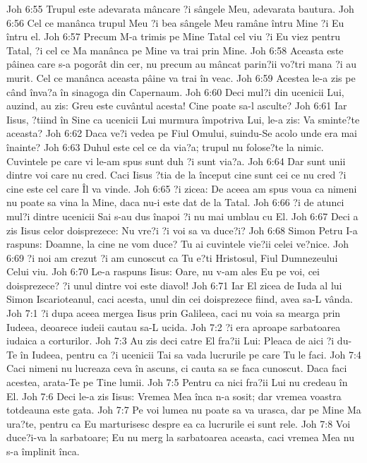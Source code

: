 Joh 6:55  Trupul este adevarata mâncare ?i sângele Meu, adevarata bautura.
Joh 6:56  Cel ce manânca trupul Meu ?i bea sângele Meu ramâne întru Mine ?i Eu întru el.
Joh 6:57  Precum M-a trimis pe Mine Tatal cel viu ?i Eu viez pentru Tatal, ?i cel ce Ma manânca pe Mine va trai prin Mine.
Joh 6:58  Aceasta este pâinea care s-a pogorât din cer, nu precum au mâncat parin?ii vo?tri mana ?i au murit. Cel ce manânca aceasta pâine va trai în veac.
Joh 6:59  Acestea le-a zis pe când înva?a în sinagoga din Capernaum.
Joh 6:60  Deci mul?i din ucenicii Lui, auzind, au zis: Greu este cuvântul acesta! Cine poate sa-l asculte?
Joh 6:61  Iar Iisus, ?tiind în Sine ca ucenicii Lui murmura împotriva Lui, le-a zis: Va sminte?te aceasta?
Joh 6:62  Daca ve?i vedea pe Fiul Omului, suindu-Se acolo unde era mai înainte?
Joh 6:63  Duhul este cel ce da via?a; trupul nu folose?te la nimic. Cuvintele pe care vi le-am spus sunt duh ?i sunt via?a.
Joh 6:64  Dar sunt unii dintre voi care nu cred. Caci Iisus ?tia de la început cine sunt cei ce nu cred ?i cine este cel care Îl va vinde.
Joh 6:65  ?i zicea: De aceea am spus voua ca nimeni nu poate sa vina la Mine, daca nu-i este dat de la Tatal.
Joh 6:66  ?i de atunci mul?i dintre ucenicii Sai s-au dus înapoi ?i nu mai umblau cu El.
Joh 6:67  Deci a zis Iisus celor doisprezece: Nu vre?i ?i voi sa va duce?i?
Joh 6:68  Simon Petru I-a raspuns: Doamne, la cine ne vom duce? Tu ai cuvintele vie?ii celei ve?nice.
Joh 6:69  ?i noi am crezut ?i am cunoscut ca Tu e?ti Hristosul, Fiul Dumnezeului Celui viu.
Joh 6:70  Le-a raspuns Iisus: Oare, nu v-am ales Eu pe voi, cei doisprezece? ?i unul dintre voi este diavol!
Joh 6:71  Iar El zicea de Iuda al lui Simon Iscarioteanul, caci acesta, unul din cei doisprezece fiind, avea sa-L vânda.
Joh 7:1  ?i dupa aceea mergea Iisus prin Galileea, caci nu voia sa mearga prin Iudeea, deoarece iudeii cautau sa-L ucida.
Joh 7:2  ?i era aproape sarbatoarea iudaica a corturilor.
Joh 7:3  Au zis deci catre El fra?ii Lui: Pleaca de aici ?i du-Te în Iudeea, pentru ca ?i ucenicii Tai sa vada lucrurile pe care Tu le faci.
Joh 7:4  Caci nimeni nu lucreaza ceva în ascuns, ci cauta sa se faca cunoscut. Daca faci acestea, arata-Te pe Tine lumii.
Joh 7:5  Pentru ca nici fra?ii Lui nu credeau în El.
Joh 7:6  Deci le-a zis Iisus: Vremea Mea înca n-a sosit; dar vremea voastra totdeauna este gata.
Joh 7:7  Pe voi lumea nu poate sa va urasca, dar pe Mine Ma ura?te, pentru ca Eu marturisesc despre ea ca lucrurile ei sunt rele.
Joh 7:8  Voi duce?i-va la sarbatoare; Eu nu merg la sarbatoarea aceasta, caci vremea Mea nu s-a împlinit înca.
